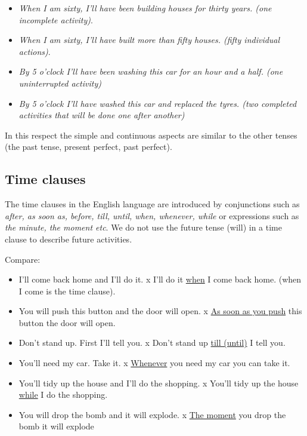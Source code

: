 \begin{itemize}

\item \textit{When I am sixty, I'll have been building houses for thirty years. (one incomplete activity)}.
\item \textit{When I am sixty, I'll have built more than fifty houses. (fifty individual actions)}.
\item \textit{By 5 o'clock I'll have been washing this car for an hour and a half. (one uninterrupted activity)}
\item \textit{By 5 o'clock I'll have washed this car and replaced the tyres. (two completed activities that will be done one after another)}

\end{itemize}

In this respect the simple and continuous aspects are similar to the other tenses (the past tense, present perfect, past perfect).

\subsection{Time clauses}

The time clauses in the English language are introduced by conjunctions such as \textit{after, as soon as, before, till, until, when, whenever, while} or expressions such as \textit{the minute, the moment etc}. We do not use the future tense (will) in a time clause to describe future activities.

Compare:

\begin{itemize}

\item I'll come back home and I'll do it. x I'll do it \underline{when} I come back home. (when I come is the time clause).
\item You will push this button and the door will open. x \underline{As soon as you push} this button the door will open.  
\item Don't stand up. First I'll tell you. x Don't stand up \underline{till (until)} I tell you. 
\item You'll need my car. Take it. x \underline{Whenever} you need my car you can take it. 
\item You'll tidy up the house and I'll do the shopping. x You'll tidy up the house \underline{while} I do the shopping. 
\item You will drop the bomb and it will explode. x \underline{The moment} you drop the bomb it will explode
\end{itemize}


